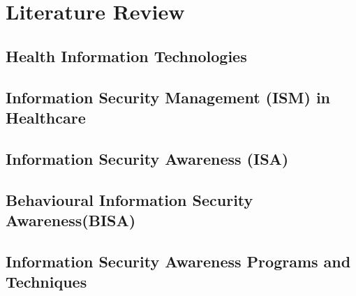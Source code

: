 \chapter{Literature Review}
\label{c:literatur}




\section{Health Information Technologies}
\label{c:literatur:summaries:info-sec-awa-helth}


\section{Information Security Management (ISM) in Healthcare }
\label{c:literatur:summaries:Information Security}


%

\section{Information Security Awareness (ISA)}
\label{c:literatur:summaries:info-sec-awa}


\section{Behavioural Information Security Awareness(BISA)}
\label{c:literatur:summaries:behav-info-sec-awa}


\section{Information Security Awareness Programs and Techniques }
\label{c:literatur:summaries:info-sec-awa-prog}



%